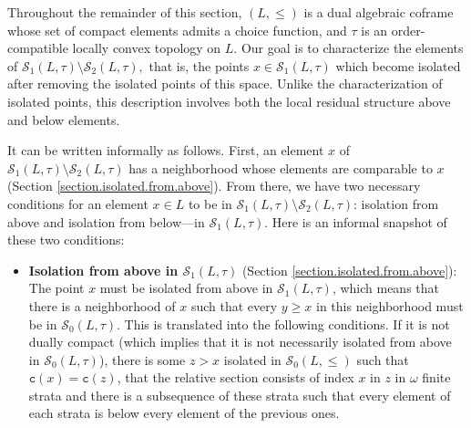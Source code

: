 \documentclass{article}
\begin{document}
Throughout the remainder of this section, \((L,\leq)\) is a dual algebraic coframe whose set of compact elements admits a choice function, and \(\tau\) is an order-compatible locally convex topology on \(L\). Our goal is to characterize the elements of \(\mathcal S_1(L,\tau)\setminus\mathcal S_2(L,\tau),\) that is, the points $x \in \mathcal{S}_1(L,\tau)$ which become isolated after removing the isolated points of this space. Unlike the characterization of isolated points, this description involves both the local residual structure above and below elements. 
{It can be written informally as follows. First, an element \(x\) of $\mathcal S_1(L,\tau)\setminus\mathcal S_2(L,\tau)$ has a neighborhood whose elements are comparable to \(x\) (Section \ref{section.isolated.from.above}). From there, we have two necessary conditions for an element $x \in L$ to be in $\mathcal S_1(L,\tau)\setminus\mathcal S_2(L,\tau)$: isolation from above and isolation from below---in $\mathcal S_1(L,\tau)$. Here is an informal snapshot of these two conditions: 
\begin{itemize}
\item\textbf{Isolation from above in $\mathcal S_1(L,\tau)$} (Section \ref{section.isolated.from.above}): { The point $x$ must be isolated from above in $\mathcal{S}_1(L,\tau)$, which means that there is a neighborhood of $x$ such that every $y \ge x$ in this neighborhood must be in $\mathcal{S}_0(L,\tau)$. This is translated into the following conditions.}
If it is not dually compact (which implies that it is not necessarily isolated from above in $\mathcal S_0(L,\tau)$), there is some $z > x$ isolated in $\mathcal{S}_0(L,\le)$
such that $\texttt{c}(x) = \texttt{c}(z)$, that the relative section 
consists of index $x$ in $z$ in $\omega$ finite strata and there is a subsequence of these strata such that every element of each strata is below every element of the previous ones.


\end{itemize}}
\end{document}
